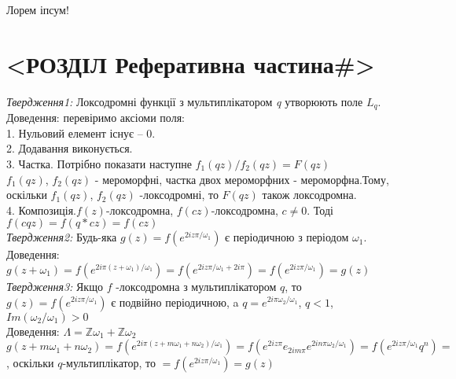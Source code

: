 \documentclass[12pt,a4paper]{article}
\begin{document}
Лорем іпсум!\cite{alias}

\clearpage

\section{<РОЗДІЛ Реферативна частина\#>}

\emph{Твердження1:} Локсодромні функції з мультиплікатором \textit{q} утворюють поле $L_{q}$. \\
Доведення: перевіримо аксіоми поля:\\
1. Нульовий елемент існує -- 0.\\
2. Додавання виконується.\\
3. Частка. Потрібно показати наступне $f_{1}(qz)/f_{2}(qz)=F(qz)$\\
$f_{1}(qz)$, $f_{2}(qz)$ - мероморфні, частка двох мероморфних - мероморфна.Тому, оскільки $f_{1}(qz)$, $f_{2}(qz)$ -локсодромні, то $ F(qz)$ також локсодромна.\\
4. Композиція.$f(z)$-локсодромна, $f(cz)$-локсодромна, $c \neq 0$. Тоді  $f(cqz)=f(q*cz)=f(cz)$\\

\emph{Твердження2:} Будь-яка $g(z)=f(e^{2iz\pi/\omega_{1}})$ є періодичною з періодом $\omega_{1}$.\\
Доведення: $g(  z+\omega_{1}  ) = f(  e^{  2i\pi (z+\omega_{1})  / \omega_{1}  }  ) =  f(  e^{  2iz\pi / \omega_{1}  +2i\pi } ) = f(  e^{  2iz\pi / \omega_{1}  } ) = g(z)$ \\

\emph{Твердження3:} Якщо $f$  -локсодромна з мультиплікатором $q$, то  $g(z)=f(e^{2iz\pi/\omega_{1}})$ є подвійно періодичною, a $q=e^{2i\pi \omega_{2}/ \omega_{1}}$, $q<1$, $Im(\omega_{2}/\omega_{1})>0$\\
Доведення: $ \Lambda = \mathbb{Z}\omega_{1} + \mathbb{Z}\omega_{2} $ \\
$g(z+m\omega_{1}+ n\omega_{2})= f(e^{2i\pi(z+m\omega_{1}+ n\omega_{2})/\omega_{1}})=f( e^{2iz\pi}e_{2im\pi}e^{2in\pi\omega_{2} / \omega_{1}} )=f(e^{2iz\pi/\omega_{1}}q^{n})= $, оскільки $q$-мультиплікатор, то
 $=f(e^{2iz\pi/\omega_{1}})=g(z)$\\
 
\end{document}
